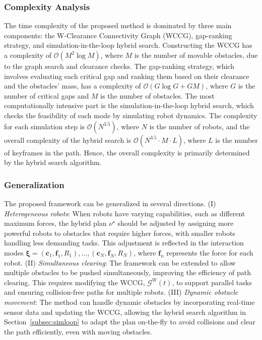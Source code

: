 \subsubsection{Complexity Analysis}\label{subsubsec:complexity}

The time complexity of the proposed method is dominated by three main components: the W-Clearance
Connectivity Graph (WCCG), gap-ranking strategy, and simulation-in-the-loop hybrid search. Constructing
the WCCG has a complexity of $\mathcal{O}(M^2 \log M)$, where $M$ is the number of movable obstacles,
due to the graph search and clearance checks. The gap-ranking strategy, which involves evaluating each
critical gap and ranking them based on their clearance and the obstacles’ mass, has a complexity of
$\mathcal{O}(G \log G + G M)$, where $G$ is the number of critical gaps and $M$ is the number of obstacles.
The most computationally intensive part is the simulation-in-the-loop hybrid search, which checks the feasibility
of each mode by simulating robot dynamics. The complexity for each simulation step is $\mathcal{O}(N^{3.5})$, where
$N$ is the number of robots, and the overall complexity of the hybrid search is $\mathcal{O}(N^{3.5} \cdot M \cdot L)$,
where $L$ is the number of keyframes in the path. Hence, the overall complexity is primarily determined by the hybrid
search algorithm.




\subsubsection{Generalization}\label{subsec:general}

The proposed framework can be generalized in several directions. (I) \emph{Heterogeneous robots}:
When robots have varying capabilities, such as different maximum forces, the hybrid plan $\nu^\star$
should be adjusted by assigning more powerful robots to obstacles that require higher forces,
with smaller robots handling less demanding tasks. This adjustment is reflected in the interaction modes
$\boldsymbol{\xi} = (\mathbf{c}_1, \mathbf{f}_1, R_1), \dots, (\mathbf{c}_N, \mathbf{f}_N, R_N)$,
where $\mathbf{f}_n$ represents the force for each robot. (II) \emph{Simultaneous clearing}:
The framework can be extended to allow multiple obstacles to be pushed simultaneously,
improving the efficiency of path clearing. This requires modifying the WCCG, $\mathcal{G}^W(t)$,
to support parallel tasks and ensuring collision-free paths for multiple robots. (III) \emph{Dynamic
obstacle movement}: The method can handle dynamic obstacles by incorporating real-time sensor data
and updating the WCCG, allowing the hybrid search algorithm in Section~\ref{subsec:simloop} to adapt the plan
on-the-fly to avoid collisions and clear the path efficiently, even with moving obstacles.
